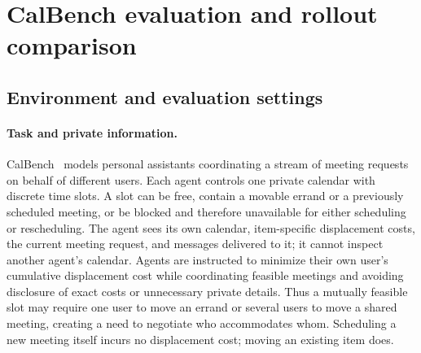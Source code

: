 \section{CalBench evaluation and rollout comparison}
\label{app:calbench}

\subsection{Environment and evaluation settings}
\label{app:calbench-setting}

\paragraph{Task and private information.}
CalBench~\citep{zou2026calbench} models personal assistants coordinating a
stream of meeting requests on behalf of different users. Each agent controls
one private calendar with discrete time slots. A slot can be free, contain a
movable errand or a previously scheduled meeting, or be blocked and therefore
unavailable for either scheduling or rescheduling. The agent sees its own
calendar, item-specific displacement costs, the current meeting request, and
messages delivered to it; it cannot inspect another agent's calendar.
Agents are instructed to minimize their own user's cumulative displacement
cost while coordinating feasible meetings and avoiding disclosure of exact
costs or unnecessary private details. Thus a mutually feasible slot may
require one user to move an errand or several users to move a shared meeting,
creating a need to negotiate who accommodates whom. Scheduling a new meeting
itself incurs no displacement cost; moving an existing item does.

